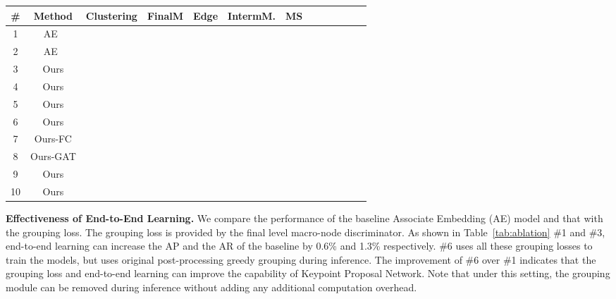 \documentclass[runningheads]{llncs}
\begin{document}
	\begin{table*}[t]
		\centering
		\scriptsize
		\caption{Ablation study of HGG's components on the COCO validation dataset.``FinalM'' means the final level macro-node discriminator. ``Edge'' means edge discriminator. `` IntermM'' means intermediate macro-node discriminator. ``MS'' means multi-scale testing. }
		\begin{tabular}{c|c|c|c|c|c|c|c|c|c|c|c|c}
			\hline
			\# & Method & Clustering  & FinalM & Edge & IntermM. & MS &  &  &   &  &  &  \\
			\hline
			1 & AE~\cite{newell2017associative} &  & & & & & & &  &  &  &  \\
			2 & AE~\cite{newell2017associative} &  & & & & \checkmark & & &  &  &  &  \\ \hline
			3 & Ours &\checkmark  & \checkmark& &  &  &  &  &  &  &  &  \\
			4 & Ours &\checkmark  &  & \checkmark &  &  &  &  &  &  &  &  \\
			5 & Ours &\checkmark  & \checkmark& \checkmark & & &  &  &  &  &  &  \\
			6 & Ours &  & \checkmark&\checkmark &\checkmark & &  &  &   &  &  &  \\
			7 & Ours-FC &\checkmark  & \checkmark&\checkmark &\checkmark & &  &  &   &  &  &  \\
			8 & Ours-GAT &\checkmark  & \checkmark&\checkmark &\checkmark & &  &  &   &  &  &  \\
			9 & Ours &\checkmark  & \checkmark&\checkmark &\checkmark & &  &  &   &  &  &  \\
			10& Ours &\checkmark  & \checkmark&\checkmark &\checkmark &\checkmark &  &  &  &  &  &  \\ \hline
		\end{tabular}
		\label{tab:ablation}
	\end{table*}
	
	\textbf{Effectiveness of End-to-End Learning.}
	We compare the performance of the baseline Associate Embedding (AE) model and that with the grouping loss. The grouping loss is provided by the final level macro-node discriminator. As shown in Table~\ref{tab:ablation} \#1 and \#3, end-to-end learning can increase the AP and the AR of the baseline by 0.6\% and 1.3\% respectively. \#6 uses all these grouping losses to train the models, but uses original post-processing greedy grouping during inference. The improvement of \#6 over \#1 indicates that the grouping loss and end-to-end learning can improve the capability of Keypoint Proposal Network. Note that under this setting, the grouping module can be removed during inference without adding any additional computation overhead.
	
\end{document}
